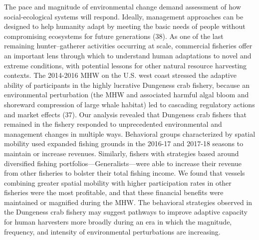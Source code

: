 \documentclass[9pt,twocolumn,twoside,lineno]{pnas-new}
\begin{document}
The pace and magnitude of environmental change demand assessment of how
social-ecological systems will respond. Ideally, management approaches
can be designed to help humanity adapt by meeting the basic needs of
people without compromising ecosystems for future generations (38). As
one of the last remaining hunter--gatherer activities occurring at
scale, commercial fisheries offer an important lens through which to
understand human adaptations to novel and extreme conditions, with
potential lessons for other natural resource harvesting contexts. The
2014-2016 MHW on the U.S. west coast stressed the adaptive ability of
participants in the highly lucrative Dungeness crab fishery, because an
environmental perturbation (the MHW and associated harmful algal bloom
and shoreward compression of large whale habitat) led to cascading
regulatory actions and market effects (37). Our analysis revealed that
Dungeness crab fishers that remained in the fishery responded to
unprecedented environmental and management changes in multiple ways.
Behavioral groups characterized by spatial mobility used expanded
fishing grounds in the 2016-17 and 2017-18 seasons to maintain or
increase revenues. Similarly, fishers with strategies based around
diversified fishing portfolios---Generalists---were able to increase
their revenue from other fisheries to bolster their total fishing
income. We found that vessels combining greater spatial mobility with
higher participation rates in other fisheries were the most profitable,
and that these financial benefits were maintained or magnified during
the MHW. The behavioral strategies observed in the Dungeness crab
fishery may suggest pathways to improve adaptive capacity for human
harvesters more broadly during an era in which the magnitude, frequency,
and intensity of environmental perturbations are increasing.
\end{document}
